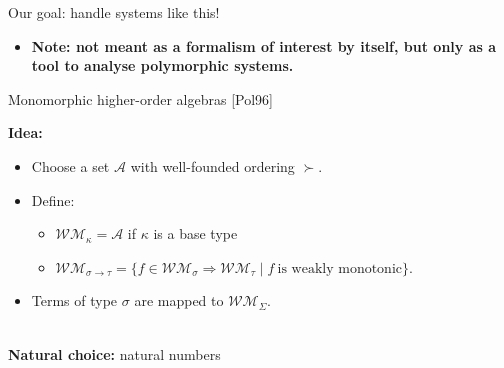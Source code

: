 \documentclass[10pt,presentation,color=names]{beamer}
\newcommand{\arrtype}{\rightarrow}
\newcommand{\abs}[2]{\lambda #1.#2}
\newcommand{\tabs}[2]{\Lambda #1.#2}
\newcommand{\red}{\longrightarrow}
\newcommand{\WM}{\mathcal{W\!M}}
\newcommand{\symb}[1]{\textcolor{blue}{\mathtt{#1}}}
\newcommand{\var}[1]{\textcolor{red}{#1}}
\newcommand{\fold}{\symb{fold}}
\begin{document}
\begin{frame}{Our goal: handle systems like this!}
\begin{itemize}
\[\begin{array}{rcll}
  \multicolumn{4}{r}{\uncover<4->{
    \fold_{\sigma}(\var{F},\symb{@}_{\tau,\sigma}(\symb{@}_{\sigma,\tau \arrtype \sigma}(\symb{tapp}_{\lambda \alpha.\sigma \arrtype \alpha \arrtype \sigma,\tau}(\var{F}), \var{a}), \var{x}),\var{xs})
  }} \\
\uncover<3->{\symb{@}_{\sigma,\tau}(\abs{x:\sigma.s},t)} & \uncover<3->{\red} & \uncover<3->{s[x:=t]} &
  \uncover<3>{\alert{\Longleftarrow}} \\
\uncover<3->{\symb{tapp}_{\lambda \alpha.\sigma,\tau}(\tabs{\alpha}{s})} & \uncover<3->{\red} & \uncover<3->{s[\alpha:=\tau]} &
  \uncover<3>{\alert{\Longleftarrow}} \\
\end{array}
\]
\item\pause\pause\pause \textbf{\alert{Note:} not meant as a formalism of interest by itself, but only as a tool to analyse polymorphic systems.}
\end{itemize}
\end{frame}

\begin{frame}{Monomorphic higher-order algebras [Pol96]}

\textbf{Idea:}
\begin{itemize}
\item Choose a set $\mathcal{A}$ with well-founded ordering $\succ$.
\item Define:
  \begin{itemize}
  \item $\WM_{\kappa} = \mathcal{A}$ if $\kappa$ is a \alert{base type}
  \item $\WM_{\sigma \arrtype \tau} = \{ f \in \WM_\sigma \Longrightarrow \WM_\tau \mid f\ \text{is weakly monotonic} \}$.
  \end{itemize}
\item Terms of type $\sigma$ are mapped to $\WM_\Sigma$.
\end{itemize}

\ \\\textbf{Natural choice:} natural numbers

\end{frame}
\end{document}
